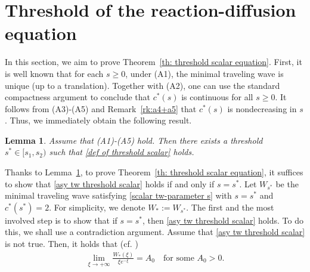 \documentclass[11pt,a4paper]{article}
\newtheorem{lemma}[theorem]{\textbf{Lemma}}
\numberwithin{equation}{section}
\numberwithin{figure}{section}
\newcommand\bea{\begin{eqnarray}}
\newcommand\eea{\end{eqnarray}}
\begin{document}

\section{Threshold of the reaction-diffusion equation}\label{sec:threshold scalar}


In this section, we aim to prove Theorem~\ref{th: threshold scalar equation}.
First, it is well known that for each $s\geq0$, under (A1), the minimal traveling wave is unique (up to a translation).
Together with (A2), one can use the standard compactness argument to conclude that $c^*(s)$ is continuous for all $s\ge 0$.
It follows from (A3)-(A5) and Remark~\ref{rk:a4+a5} that $c^*(s)$ is nondecreasing in $s$. Thus, we immediately obtain the following result.

\begin{lemma}\label{lem: th1-part1}
Assume that (A1)-(A5) hold. Then there exists a threshold $s^*\in[s_1,s_2)$ such that \eqref{def of threshold scalar} holds.
\end{lemma}



Thanks to Lemma~\ref{lem: th1-part1}, to prove Theorem~\ref{th: threshold scalar equation}, it suffices to show that
\eqref{asy tw threshold scalar} holds if and only if $s=s^*$.
Let $W_{s^*}$ be the minimal traveling wave satisfying \eqref{scalar tw-parameter s} with $s=s^*$
and $c^*(s^*)=2$. For simplicity, we denote $W_*:=W_{s^*}$.
The first and the most involved step is to show that if $s=s^*$, then \eqref{asy tw threshold scalar} holds.
To do this, we shall use a contradiction argument.
Assume that \eqref{asy tw threshold scalar} is not true. Then, %
it holds that (cf. \cite{Aronson Weinberger})
\bea\label{AS-U-infty-for-contradiction scalar}
\lim_{\xi\rightarrow+\infty}\frac{W_{*}(\xi)}{\xi e^{-\xi}}=A_0\quad \mbox{for some $A_0>0$.}
\eea
\end{document}
